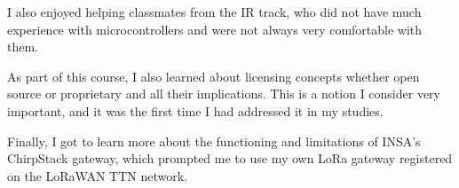 \noindent I also enjoyed helping classmates from the IR track, who did not have much experience with microcontrollers and were not always very comfortable with them.
\vspace{0.25cm}

\noindent As part of this course, I also learned about licensing concepts whether open source or proprietary and all their implications. This is a notion I consider very important, and it was the first time I had addressed it in my studies.
\vspace{0.25cm}

\noindent Finally, I got to learn more about the functioning and limitations of INSA's ChirpStack gateway, which prompted me to use my own LoRa gateway registered on the LoRaWAN TTN network.
